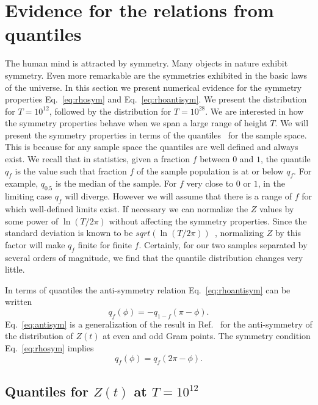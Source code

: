 \documentclass[twoside]{article}
\begin{document}
\section{\label{sec4}Evidence for the relations from quantiles}
  
The human mind is attracted by symmetry. Many objects in nature exhibit symmetry.
Even more remarkable are the symmetries exhibited in the basic laws of the 
universe. In this section we present  numerical evidence for the symmetry properties
Eq.~\ref{eq:rhosym} and Eq.~\ref{eq:rhoantisym}. 
We  present the distribution for $T=10^{12}$, followed by the distribution for $T=10^{28}$.  
We are interested in how the symmetry properties behave when we span a large range of 
height $T$.
We will present the symmetry properties in terms of the quantiles~\cite{feller} 
for the sample space. This is because for any sample space the quantiles are well defined 
and always exist. We recall that in statistics, given a fraction $f$ between $0$ and $1$, 
the quantile $q_f$ is the value such that fraction $f$  of the sample population is 
at or below $q_f$. For example, $q_{0.5}$ is the median of the sample.
For $f$ very close to $0$ or $1$, in the limiting case $q_f$ will diverge. 
However we will assume that there is a range of $f$ for which well-defined limits exist. 
If necessary we can normalize the $Z$ values by some power of $\ln(T/2\pi)$ without 
affecting the symmetry properties. Since the standard deviation is 
known to be $sqrt(\ln(T/2\pi))$~\cite{Shanker 2018b}, 
normalizing $Z$ by this factor will make $q_f$ finite for finite $f$. 
Certainly, for our two samples separated by several orders of magnitude, 
we find that the quantile distribution changes very little. 

In terms of quantiles the anti-symmetry relation Eq.~\ref{eq:rhoantisym} 
can be written
\begin{equation}
q_{f}(\phi) = -q_{1-f}(\pi-\phi).
\label{eq:antisym}
\end{equation}
Eq.~\ref{eq:antisym}  is a generalization of the result in Ref.~\cite{Shanker 2018a} 
for the anti-symmetry of the distribution of $Z(t)$ at even and odd Gram points. 
The  symmetry condition Eq.~\ref{eq:rhosym} implies
\begin{equation}
q_{f}(\phi) = q_{f}(2\pi-\phi).
\label{eq:sym}
\end{equation}




\subsection{\label{E12}Quantiles for $Z(t)$ at $T=10^{12}$}
\end{document}
